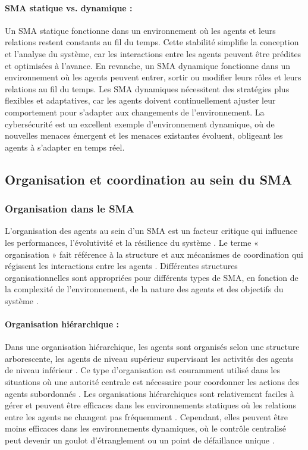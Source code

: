 \paragraph{SMA statique vs. dynamique :}
Un SMA statique fonctionne dans un environnement où les agents et leurs relations restent constants au fil du temps. Cette stabilité simplifie la conception et l'analyse du système, car les interactions entre les agents peuvent être prédites et optimisées à l'avance. En revanche, un SMA dynamique fonctionne dans un environnement où les agents peuvent entrer, sortir ou modifier leurs rôles et leurs relations au fil du temps. Les SMA dynamiques nécessitent des stratégies plus flexibles et adaptatives, car les agents doivent continuellement ajuster leur comportement pour s'adapter aux changements de l'environnement. La cybersécurité est un excellent exemple d'environnement dynamique, où de nouvelles menaces émergent et les menaces existantes évoluent, obligeant les agents à s'adapter en temps réel.

\subsection{Organisation et coordination au sein du SMA}

\subsubsection{Organisation dans le SMA}

L'organisation des agents au sein d'un SMA est un facteur critique qui influence les performances, l'évolutivité et la résilience du système \cite{wooldridge2009introduction}. Le terme « organisation » fait référence à la structure et aux mécanismes de coordination qui régissent les interactions entre les agents \cite{weiss1999multiagent}. Différentes structures organisationnelles sont appropriées pour différents types de SMA, en fonction de la complexité de l'environnement, de la nature des agents et des objectifs du système \cite{durfee1999distributed}.

\paragraph{Organisation hiérarchique :}
Dans une organisation hiérarchique, les agents sont organisés selon une structure arborescente, les agents de niveau supérieur supervisant les activités des agents de niveau inférieur \cite{wooldridge2009introduction}. Ce type d'organisation est couramment utilisé dans les situations où une autorité centrale est nécessaire pour coordonner les actions des agents subordonnés \cite{durfee1999distributed}. Les organisations hiérarchiques sont relativement faciles à gérer et peuvent être efficaces dans les environnements statiques où les relations entre les agents ne changent pas fréquemment \cite{weiss1999multiagent}. Cependant, elles peuvent être moins efficaces dans les environnements dynamiques, où le contrôle centralisé peut devenir un goulot d'étranglement ou un point de défaillance unique \cite{durfee1999distributed}.

